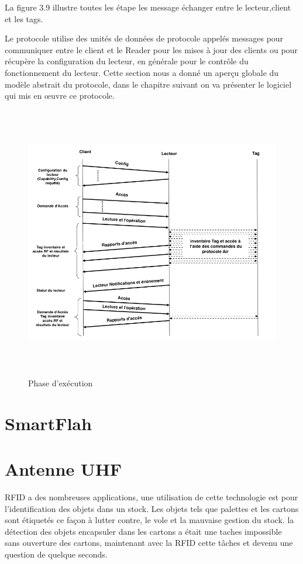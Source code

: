 \documentclass[11pt, a4paper, twoside]{book}
\begin{document}
La figure 3.9 illustre toutes les étape les message échanger entre le lecteur,client et les tags.

Le protocole utilise des unités de données de protocole appelés messages pour communiquer entre le client et le Reader pour  les mises à jour des clients ou pour récupère la configuration du lecteur, en générale pour le contrôle du fonctionnement du lecteur. Cette section nous a donné un aperçu globale du modèle abstrait du protocole, dans le chapitre suivant on va présenter le logiciel qui mis en œuvre ce protocole.
\begin{figure}[H]
\centering
\includegraphics[height=12cm]{runtime}
\caption{Phase d'exécution}
\end{figure}






\section{SmartFlah}
\pagebreak
\section{Antenne UHF}
RFID a des nombreuses applications, une utilisation de cette technologie est pour l'identification des objets dans un stock. Les objets tels que palettes et les cartons sont étiquetés ce façon à lutter contre, le vole et la mauvaise gestion du stock. la détection des objets encapsuler dans les cartons a était une taches impossible sans ouverture des cartons, maintenant avec la RFID cette tâches et devenu une question de quelque seconds.
\end{document}
